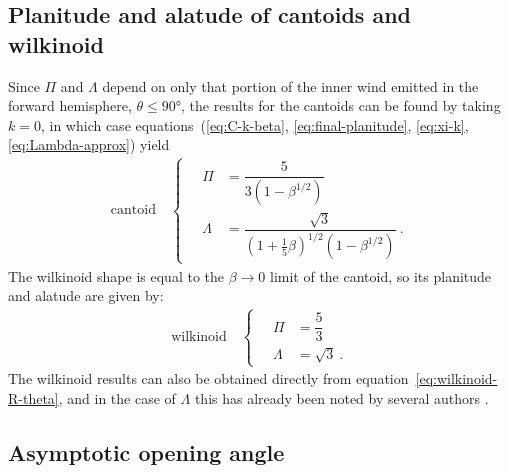 \documentclass[useAMS, usenatbib, a4paper]{mnras}
\begin{document}
\subsection{Planitude and alatude of cantoids and wilkinoid}
\label{sec:cantoid-wilkinoid-shapes}

Since \(\Pi\) and \(\Lambda\) depend on only that portion of the inner wind
emitted in the forward hemisphere, \(\theta \le \ang{90}\), the results for the
cantoids can be found by taking \(k = 0\), in which case
equations~(\ref{eq:C-k-beta}, \ref{eq:final-planitude}, \ref{eq:xi-k},
\ref{eq:Lambda-approx}) yield
\begin{gather}
  \label{eq:cantoid-Pi-Lambda}
  \text{cantoid} \quad
  \begin{cases}
    \quad \Pi &= \dfrac {5} {3 \left( 1 - \beta^{1/2} \right)}\\[12pt]
    \quad \Lambda &= \dfrac { \sqrt 3} {\left( 1 + \tfrac15 \beta \right)^{1/2} \left( 1 - \beta^{1/2} \right)} \ .
  \end{cases}
\end{gather}
The wilkinoid shape is equal to the \(\beta \to 0\) limit of the cantoid, so
its planitude and alatude are given by:
\begin{gather}
  \label{eq:wilkinoid-Pi-Lambda}
  \text{wilkinoid} \quad
  \begin{cases}
    \quad \Pi &= \dfrac {5} {3}\\[10pt]
    \quad \Lambda &= \sqrt 3 \ .
  \end{cases}
\end{gather}
The wilkinoid results can also be obtained directly from
equation~\eqref{eq:wilkinoid-R-theta}, and in the case of \(\Lambda\) this
has already been noted by several authors \citep{Cox:2012a,
  Meyer:2016a}.

\subsection{Asymptotic opening angle}
\label{sec:asympt-open-angle}
\end{document}
